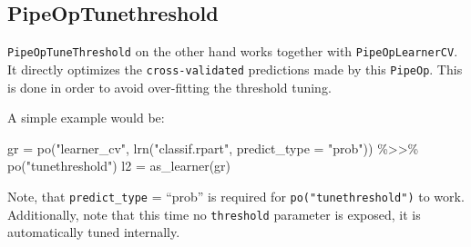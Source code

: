 \documentclass[
]{scrbook}
\newenvironment{Shaded}{\begin{snugshade}}{\end{snugshade}}
\newcommand{\AttributeTok}[1]{\textcolor[rgb]{0.77,0.63,0.00}{#1}}
\newcommand{\FunctionTok}[1]{\textcolor[rgb]{0.00,0.00,0.00}{#1}}
\newcommand{\NormalTok}[1]{#1}
\newcommand{\OtherTok}[1]{\textcolor[rgb]{0.56,0.35,0.01}{#1}}
\newcommand{\SpecialCharTok}[1]{\textcolor[rgb]{0.00,0.00,0.00}{#1}}
\newcommand{\StringTok}[1]{\textcolor[rgb]{0.31,0.60,0.02}{#1}}
\renewenvironment{Shaded} {\begin{snugshade}\small} {\end{snugshade}}
\begin{document}
\hypertarget{pipeoptunethreshold}{%
\subsection{PipeOpTunethreshold}\label{pipeoptunethreshold}}

\texttt{PipeOpTuneThreshold} on the other hand works together with \texttt{PipeOpLearnerCV}.
It directly optimizes the \texttt{cross-validated} predictions made by this \texttt{PipeOp}.
This is done in order to avoid over-fitting the threshold tuning.

A simple example would be:

\begin{Shaded}
\begin{Highlighting}[]
\NormalTok{gr }\OtherTok{=} \FunctionTok{po}\NormalTok{(}\StringTok{"learner\_cv"}\NormalTok{, }\FunctionTok{lrn}\NormalTok{(}\StringTok{"classif.rpart"}\NormalTok{, }\AttributeTok{predict\_type =} \StringTok{"prob"}\NormalTok{)) }\SpecialCharTok{\%\textgreater{}\textgreater{}\%} \FunctionTok{po}\NormalTok{(}\StringTok{"tunethreshold"}\NormalTok{)}
\NormalTok{l2 }\OtherTok{=} \FunctionTok{as\_learner}\NormalTok{(gr)}
\end{Highlighting}
\end{Shaded}

Note, that \texttt{predict\_type} = ``prob'' is required for \texttt{po("tunethreshold")} to work.
Additionally, note that this time no \texttt{threshold} parameter is exposed, it is automatically tuned internally.

\begin{Shaded}
\end{Shaded}
\end{document}
